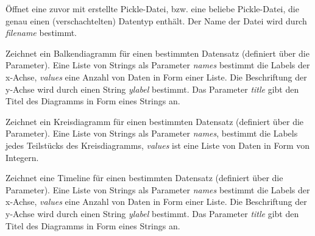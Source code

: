 \documentclass[letterpaper,10pt,english]{sphinxmanual}
\begin{document}
\begin{fulllineitems}
\label{project_3:project_3.open_from_pickle}
Öffnet eine zuvor mit {\hyperref[project_3:project_3.save_as_pickle]{}} erstellte Pickle-Datei, bzw. eine beliebe Pickle-Datei, die genau einen (verschachtelten) Datentyp enthält. Der Name der Datei wird durch \emph{filename} bestimmt.

\end{fulllineitems}


\begin{fulllineitems}
\label{project_3:project_3.draw_barchart}
Zeichnet ein Balkendiagramm für einen bestimmten Datensatz (definiert über die Parameter).
Eine Liste von Strings als Parameter \emph{names} bestimmt die Labels der x-Achse, \emph{values} eine Anzahl von Daten in Form einer Liste. Die Beschriftung der y-Achse wird durch einen String \emph{ylabel} bestimmt. Das Parameter \emph{title} gibt den Titel des Diagramms in Form eines Strings an.

\end{fulllineitems}


\begin{fulllineitems}
\label{project_3:project_3.draw_piechart}
Zeichnet ein Kreisdiagramm für einen bestimmten Datensatz (definiert über die Parameter). Eine Liste von Strings als Parameter \emph{names}, bestimmt die Labels jedes Teilstücks des Kreisdiagramms, \emph{values} ist eine Liste von Daten in Form von Integern.

\end{fulllineitems}


\begin{fulllineitems}
\label{project_3:project_3.draw_timeline}
Zeichnet eine Timeline für einen bestimmten Datensatz (definiert über die Parameter).
Eine Liste von Strings als Parameter \emph{names} bestimmt die Labels der x-Achse, \emph{values} eine Anzahl von Daten in Form einer Liste. Die Beschriftung der y-Achse wird durch einen String \emph{ylabel} bestimmt. Das Parameter \emph{title} gibt den Titel des Diagramms in Form eines Strings an.

\end{fulllineitems}
\end{document}
